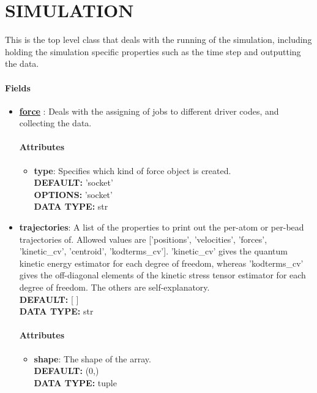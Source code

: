 \section{SIMULATION}
\label{SIMULATION}
This is the top level class that deals with the running of the simulation, including holding the simulation specific properties such as the time step and outputting the data.
\paragraph{Fields}
 \begin{itemize}
\item {\bf \hyperref[FORCES]{force} }:
 Deals with the assigning of jobs to different driver codes, and collecting the data.
\paragraph{Attributes}
 \begin{itemize}
\item {\bf type}:
 Specifies which kind of force object is created.
{\\ \bf DEFAULT: }'socket'
{\\ \bf OPTIONS: }'socket'
{\\ \bf DATA TYPE: }str
\end{itemize}
 
\item {\bf trajectories}:
 A list of the properties to print out the per-atom or per-bead trajectories of. Allowed values are ['positions', 'velocities', 'forces', 'kinetic\_cv', 'centroid', 'kodterms\_cv']. 'kinetic\_cv' gives the quantum kinetic energy estimator for each degree of freedom, whereas 'kodterms\_cv' gives the off-diagonal elements of the kinetic stress tensor estimator for each degree of freedom. The others are self-explanatory.
{\\ \bf DEFAULT: }[ ]
{\\ \bf DATA TYPE: }str
\paragraph{Attributes}
 \begin{itemize}
\item {\bf shape}:
 The shape of the array.
{\\ \bf DEFAULT: }(0,)
{\\ \bf DATA TYPE: }tuple
\end{itemize}
 

\end{itemize}
